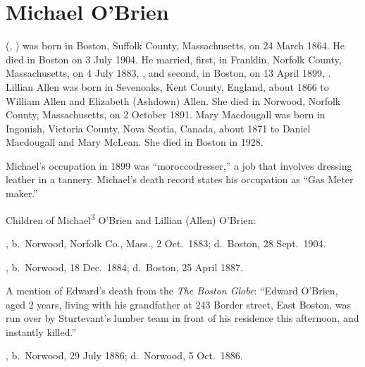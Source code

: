 \section{Michael O'Brien}

 (, ) was born in Boston, Suffolk County, Massachusetts, on 24 March 1864.\cite{Michael3OBrienBirth} He died in Boston on 3 July 1904.\cite{Michael3OBrienBirth} He married, first, in Franklin, Norfolk County, Massachusetts, on 4 July 1883, ,\cite{LillianAllenMarriage} and second, in Boston, on 13 April 1899, .\cite{MaryMacdougallMarriage} Lillian Allen was born in Sevenoaks, Kent County, England, about 1866 to William Allen and Elizabeth (Ashdown) Allen.\cite{LillianAllenMarriage,ElizabethAshdownDeath} She died in Norwood, Norfolk County, Massachusetts, on 2 October 1891.\cite{LillianAllenDeath} Mary Macdougall was born in Ingonish, Victoria County, Nova Scotia, Canada, about 1871 to Daniel Macdougall and Mary McLean.\cite{MaryMacdougallMarriage} She died in Boston in 1928.\cite{MaryMacdougallDeath}

Michael's occupation in 1899 was ``moroccodresser,''\cite{MaryMacdougallMarriage} a job that involves dressing leather in a tannery.\cite{moroccodresser} Michael's death record states his occupation as ``Gas Meter maker.''\cite{Michael3OBrienDeath} 

\begin{KidsIntro}
	Children of Michael\textsuperscript{3} O'Brien and Lillian (Allen) O'Brien:
\end{KidsIntro}

\begin{Kids}
	
	, b.\ Norwood, Norfolk Co., Mass., 2 Oct.\ 1883;\cite{Arthur4OBrienBirth} d.\ Boston, 28 Sept.\ 1904.\cite{Arthur4OBrienDeath}
	
	, b.\ Norwood, 18 Dec.\ 1884;\cite{Edward4OBrienBirth} d.\ Boston, 25 April 1887.\cite{Edward4OBrienDeath}
	
	\begin{KidsMoreText}
		A mention of Edward's death from the \textit{The Boston Globe}: ``Edward O'Brien, aged 2 years, living with his grandfather at 243 Border street, East Boston, was run over by Sturtevant's lumber team in front of his residence this afternoon, and instantly killed.''\cite{Edward4OBrienDeath2}
	\end{KidsMoreText}
	
	, b.\ Norwood, 29 July 1886;\cite{Elizabeth4OBrienBirth} d.\ Norwood, 5 Oct.\ 1886.\cite{Elizabeth4OBrienDeath}
	
\end{Kids}

